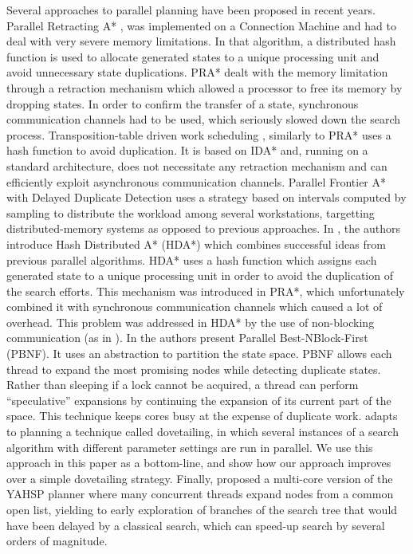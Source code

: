 \documentclass{sig-alternate}
\begin{document}
Several  approaches to  parallel planning  have been  proposed in  recent years.
Parallel Retracting A* \cite{PRA-star},  was implemented on a Connection Machine
and  had  to  deal with  very  severe  memory  limitations. In  that  algorithm,
a distributed  hash function is  used to allocate  generated states to  a unique
processing unit  and avoid unnecessary  state duplications. PRA* dealt  with the
memory limitation  through a retraction  mechanism which allowed a  processor to
free its memory by dropping states. In order to confirm the transfer of a state,
synchronous communication channels  had to be used, which  seriously slowed down
the  search  process.  Transposition-table  driven  work scheduling  \cite{TDS},
similarly to PRA* uses a hash function to avoid duplication. It is based on IDA*
and, running  on a  standard architecture, does  not necessitate  any retraction
mechanism  and  can  efficiently  exploit asynchronous  communication  channels.
Parallel  Frontier  A*  with  Delayed  Duplicate  Detection  \cite{PFADDD}  uses
a strategy  based on intervals computed  by sampling to  distribute the workload
among several workstations, targetting  distributed-memory systems as opposed to
previous approaches.  In \cite{HDA-star}, the authors introduce Hash Distributed
A*  (HDA*) which combines  successful ideas  from previous  parallel algorithms.
HDA*  uses a  hash  function which  assigns  each generated  state  to a  unique
processing unit  in order to avoid  the duplication of the  search efforts. This
mechanism  was  introduced  in   PRA*,  which  unfortunately  combined  it  with
synchronous communication channels which caused  a lot of overhead. This problem
was  addressed  in  HDA*  by  the  use  of  non-blocking  communication  (as  in
\cite{TDS}).   In   \cite{burns:ijcai2009,burns:JAIR2010}  the  authors  present
Parallel  Best-NBlock-First (PBNF).   It uses  an abstraction  to  partition the
state space.  PBNF  allows each thread to expand the  most promising nodes while
detecting duplicate states.  Rather than  sleeping if a lock cannot be acquired,
a thread can  perform ``speculative'' expansions by continuing  the expansion of
its current part  of the space.  This technique keeps cores  busy at the expense
of  duplicate work.  \cite{dovetailing}  adapts to  planning a  technique called
dovetailing, in  which several  instances of a  search algorithm  with different
parameter settings  are run in parallel. We  use this approach in  this paper as
a  bottom-line, and show  how our  approach improves  over a  simple dovetailing
strategy.  Finally,  \cite{vidal:socs2010} proposed a multi-core  version of the
YAHSP planner \cite{yahsp:icaps2004} where  many concurrent threads expand nodes
from a common open list, yielding to early exploration of branches of the search
tree that  would have  been delayed  by a classical  search, which  can speed-up
search by several orders of magnitude.
\end{document}
